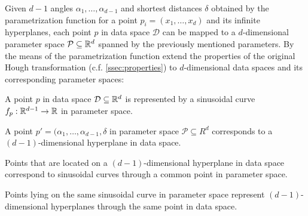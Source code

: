 Given $d-1$ angles $\alpha_1,\dotsc,\alpha_{d-1}$ and shortest distances $\delta$ obtained by the parametrization function for a point $p_i = (x_1,\dotsc,x_d)$ and its infinite hyperplanes, each point $p$ in data space $\mathcal{D}$ can be mapped to a $d$-dimensional parameter space $\mathcal{P} \subseteq \mathbb{R}^d$ spanned by the previously mentioned parameters.
By the means of the parametrization function \textcite{CASHachtert2008robust} extend the properties of the original Hough transformation (c.f. \autoref{ssec:properties}) to $d$-dimensional data spaces and its corresponding parameter spaces: 
\begin{quoting}
\begin{property}
A point $p$ in data space $\mathcal{D} \subseteq \mathbb{R}^d$ is represented by a sinusoidal curve $f_p:\mathbb{R}^{d-1}\rightarrow\mathbb{R}$ in parameter space.
\end{property}
\begin{property}
A point $p' = (\alpha_1,\dotsc,\alpha_{d-1},\delta$ in parameter space $\mathcal{P} \subseteq R^d$ corresponds to a $(d-1)$-dimensional hyperplane in data space.
\end{property}
\begin{property}
Points that are located on a $(d-1)$-dimensional hyperplane in data space correspond to sinusoidal curves through a common point in parameter space.
\end{property}
\begin{property}
Points lying on the same sinusoidal curve in parameter space represent $(d-1)$-dimensional hyperplanes through the same point in data space.
\end{property}
\end{quoting}


